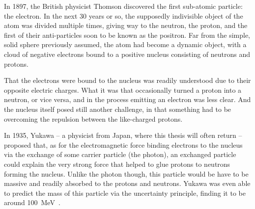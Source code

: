 In 1897, the British physicist Thomson discovered the first sub-atomic particle: the electron.
In the next 30 years or so, the supposedly indivisible object of the atom was divided multiple times, giving way to the neutron, the proton, and the first of their anti-particles soon to be known as the positron.
Far from the simple, solid sphere previously assumed, the atom had become a dynamic object, with a cloud of negative electrons bound to a positive nucleus consisting of neutrons and protons.

That the electrons were bound to the nucleus was readily understood due to their opposite electric charges.
What it was that occasionally turned a proton into a neutron, or vice versa, and in the process emitting an electron was less clear.
And the nucleus itself posed still another challenge, in that something had to be overcoming the repulsion between the like-charged protons.

In 1935, Yukawa -- a physicist from Japan, where this thesis will often return -- proposed that, as for the electromagnetic force binding electrons to the nucleus via the exchange of some carrier particle (the photon), 
an exchanged particle could explain the very strong force that helped to glue protons to neutrons forming the nucleus.
Unlike the photon though, this particle would be have to be massive and readily absorbed to the protons and neutrons.
Yukawa was even able to predict the mass of this particle via the uncertainty principle, finding it to be around 100~MeV~\cite{}.

